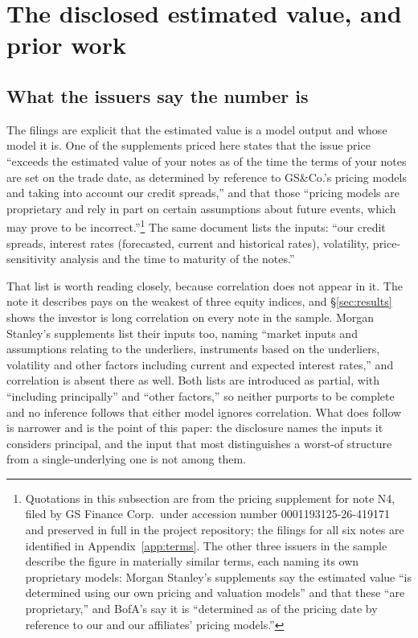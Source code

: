 \section{The disclosed estimated value, and prior work}\label{sec:prior}

\subsection{What the issuers say the number is}

The filings are explicit that the estimated value is a model output and whose
model it is. One of the supplements priced here states that the issue price
``exceeds the estimated value of your notes as of the time the terms of your
notes are set on the trade date, as determined by reference to GS\&Co.'s
pricing models and taking into account our credit spreads,'' and that those
``pricing models are proprietary and rely in part on certain assumptions about
future events, which may prove to be incorrect.''\footnote{Quotations in this
subsection are from the pricing supplement for note N4, filed by GS Finance
Corp.\ under accession number 0001193125-26-419171 and preserved in full in the
project repository; the filings for all six notes are identified in
Appendix~\ref{app:terms}. The other three issuers in the sample describe the
figure in materially similar terms, each naming its own proprietary models:
Morgan Stanley's supplements say the estimated value ``is determined using our
own pricing and valuation models'' and that these ``are proprietary,'' and
BofA's say it is ``determined as of the pricing date by reference to our and
our affiliates' pricing models.''} The same document lists the inputs: ``our credit spreads, interest rates (forecasted, current and
historical rates), volatility, price-sensitivity analysis and the time to
maturity of the notes.''

That list is worth reading closely, because correlation does not appear in it.
The note it describes pays on the weakest of three equity indices, and
\S\ref{sec:results} shows the investor is long correlation on every note in the
sample. Morgan Stanley's supplements list their inputs too, naming ``market inputs and
assumptions relating to the underliers, instruments based on the underliers,
volatility and other factors including current and expected interest rates,''
and correlation is absent there as well. Both lists are introduced as partial,
with ``including principally'' and ``other factors,'' so neither purports to be
complete and no inference follows that either model ignores correlation. What does follow is narrower and is the point of this paper: the
disclosure names the inputs it considers principal, and the input that most
distinguishes a worst-of structure from a single-underlying one is not among
them.


